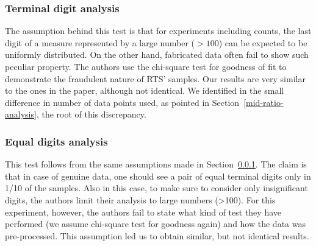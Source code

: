 \documentclass{article}
\begin{document}
\subsubsection{Terminal digit analysis}\label{terminal-digit-analysis}

The assumption behind this test is that for experiments including
counts, the last digit of a measure represented by a large number
($>100$) can be expected to be uniformly distributed. On the
other hand, fabricated data often fail to show such peculiar property.
The authors use the chi-square test for goodness of fit to demonstrate
the fraudulent nature of RTS' samples. Our results are very similar to
the ones in the paper, although not identical.
We identified in the small difference in number of data points used, as pointed in Section~\ref{mid-ratio-analysis}, the root of this discrepancy.

\subsubsection{Equal digits analysis}\label{equal-digits-analysis}

This test follows from the same assumptions made in Section~\ref{terminal-digit-analysis}.
The claim is that in case of genuine data, one should see a pair of equal terminal digits only in 1/10 of the samples. 
Also in this case, to make sure to consider only insignificant digits, the
authors limit their analysis to large numbers (>100). 
For this experiment, however,
the authors fail to state what kind of test they have performed (we
assume chi-square test for goodness again) and how the data was
pre-processed. 
This assumption led us to obtain similar, but not identical results.
\end{document}
